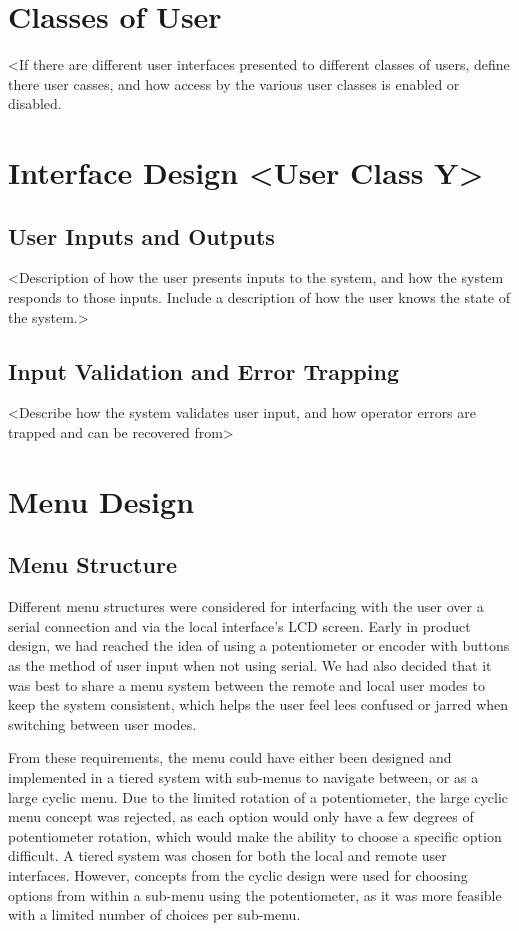 \documentclass[]{report}
\begin{document}
\section{Classes of User}
<If there are different user interfaces presented to different classes of users, define there user casses, and how access by the various user classes is enabled or disabled.

\section{Interface Design <User Class Y>}
\subsection{User Inputs and Outputs}
<Description of how the user presents inputs to the system, and how the system responds to those inputs. Include a description of how the user knows the state of the system.>

\subsection{Input Validation and Error Trapping}
<Describe how the system validates user input, and how operator errors are trapped and can be recovered from>

\section{Menu Design}
\subsection{Menu Structure}
Different menu structures were considered for interfacing with the user over a serial connection and via the local interface's LCD screen. Early in product design, we had reached the idea of using a potentiometer or encoder with buttons as the method of user input when not using serial. We had also decided that it was best to share a menu system between the remote and local user modes to keep the system consistent, which helps the user feel lees confused or jarred when switching between user modes.


From these requirements, the menu could have either been designed and implemented in a tiered system with sub-menus to navigate between, or as a large cyclic menu. Due to the limited rotation of a potentiometer, the large cyclic menu concept was rejected, as each option would only have a few degrees of potentiometer rotation, which would make the ability to choose a specific option difficult. A tiered system was chosen for both the local and remote user interfaces. However, concepts from the cyclic design were used for choosing options from within a sub-menu using the potentiometer, as it was more feasible with a limited number of choices per sub-menu.
\end{document}
